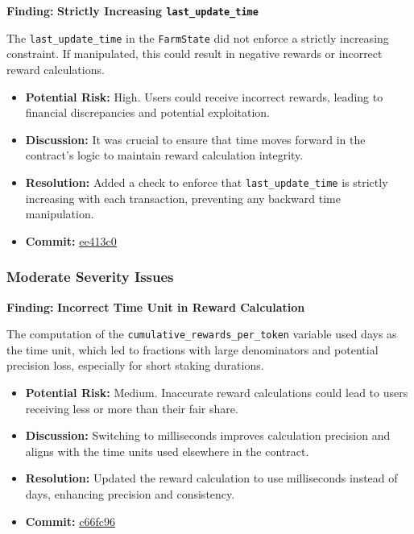 \documentclass{article}
\begin{document}
\begin{criticalbox}
\textbf{Finding:} \textbf{Strictly Increasing \texttt{last\_update\_time}}

The \texttt{last\_update\_time} in the \texttt{FarmState} did not enforce a strictly increasing constraint. If manipulated, this could result in negative rewards or incorrect reward calculations.

\begin{itemize}[label=$\diamond$]
    \item \textbf{Potential Risk:} High. Users could receive incorrect rewards, leading to financial discrepancies and potential exploitation.
    \item \textbf{Discussion:} It was crucial to ensure that time moves forward in the contract's logic to maintain reward calculation integrity.
    \item \textbf{Resolution:} Added a check to enforce that \texttt{last\_update\_time} is strictly increasing with each transaction, preventing any backward time manipulation.
    \item \textbf{Commit:} \href{https://github.com/MuesliSwapLabs/muesliswap-onchain-staking/commit/ee413c003cfa555567fd4bfbf6fa880de765f6cf}{ee413c0}
\end{itemize}
\end{criticalbox}

\subsubsection{Moderate Severity Issues}

\begin{moderatebox}
\textbf{Finding:} \textbf{Incorrect Time Unit in Reward Calculation}

The computation of the \texttt{cumulative\_rewards\_per\_token} variable used days as the time unit, which led to fractions with large denominators and potential precision loss, especially for short staking durations.

\begin{itemize}[label=$\diamond$]
    \item \textbf{Potential Risk:} Medium. Inaccurate reward calculations could lead to users receiving less or more than their fair share.
    \item \textbf{Discussion:} Switching to milliseconds improves calculation precision and aligns with the time units used elsewhere in the contract.
    \item \textbf{Resolution:} Updated the reward calculation to use milliseconds instead of days, enhancing precision and consistency.
    \item \textbf{Commit:} \href{https://github.com/MuesliSwapLabs/muesliswap-onchain-staking/commit/c66fc96dc6236ac0c8f60ff04a545cbddcd6588d}{c66fc96}
\end{itemize}
\end{moderatebox}
\end{document}
